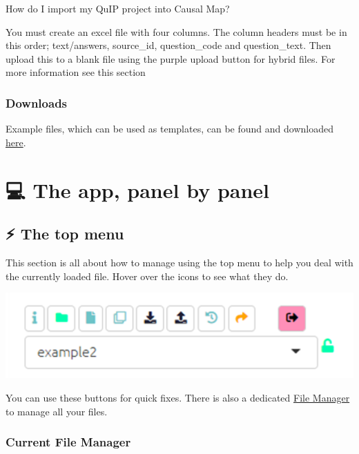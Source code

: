 \documentclass[
]{book}
\begin{document}
How do I import my QuIP project into Causal Map?

You must create an excel file with four columns. The column headers must be in this order; text/answers, source\_id, question\_code and question\_text. Then upload this to a blank file using the purple upload button for hybrid files. For more information see this section

\hypertarget{downloads}{%
\section{Downloads}\label{downloads}}

Example files, which can be used as templates, can be found and downloaded \href{https://drive.google.com/drive/folders/1wvifDQ0BXmAjSudTRUv9i_4JURpphD4v}{here}.

\hypertarget{part-the-app-panel-by-panel}{%
\part{💻 The app, panel by panel}\label{part-the-app-panel-by-panel}}

\hypertarget{xtop-menu}{%
\chapter{⚡ The top menu}\label{xtop-menu}}

This section is all about how to manage using the top menu to help you deal with the currently loaded file. Hover over the icons to see what they do.

\includegraphics[width=6.77083in,height=\textheight]{_assets/image-20211025111815970.png}

You can use these buttons for quick fixes. There is also a dedicated \protect\hyperlink{file-manager}{File Manager} to manage all your files.

\hypertarget{xpermissions}{%
\section{Current File Manager}\label{xpermissions}}
\end{document}
